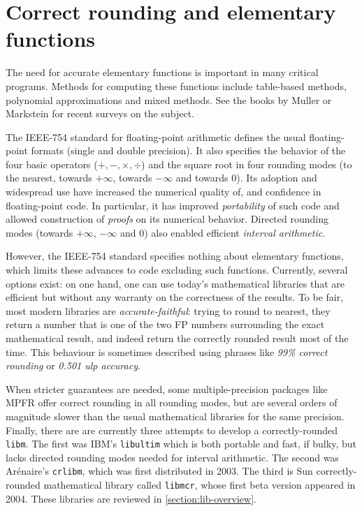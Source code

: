 



\section{Correct rounding and elementary functions}
\label{sect:intro}

The need for accurate elementary functions is important in many
critical programs.  Methods for computing these functions include
table-based methods\cite{Far81,Tan91}, polynomial approximations and
mixed methods\cite{DauMor2k}. See the books by Muller\cite{Muller97} or
Markstein\cite{Markstein2000} for recent surveys on the subject.

The IEEE-754 standard for floating-point arithmetic\cite{IEEE754}
defines the usual floating-point formats (single and double
precision). It also specifies the behavior of the four basic operators
($+,-,\times,\div$) and the square root in four rounding modes (to the
nearest, towards $+\infty$, towards $-\infty$ and towards $0$). Its
adoption and widespread use have increased the numerical quality of,
and confidence in floating-point code. In particular, it has improved
\emph{portability} of such code and allowed construction of
\emph{proofs} on its numerical behavior. Directed rounding modes
(towards $+\infty$, $-\infty$ and $0$) also enabled efficient
\emph{interval arithmetic}\cite{Moore66,KKLRW93}.

However, the IEEE-754 standard specifies nothing about elementary
functions, which limits these advances to code excluding such
functions.  Currently, several options exist: on one hand, one can use
today's mathematical libraries that are efficient but without any
warranty on the correctness of the results. To be fair, most modern
libraries are \emph{accurate-faithful}: trying to round to nearest,
they return a number that is one of the two FP numbers surrounding the
exact mathematical result, and indeed return the correctly rounded
result most of the time. This behaviour is sometimes described using
phrases like \emph{99\% correct rounding} or \emph{0.501 ulp accuracy}.

When stricter guarantees are needed, some multiple-precision packages
like MPFR \cite{MPFRweb} offer correct rounding in all rounding modes,
but are several orders of magnitude slower than the usual mathematical
libraries for the same precision. Finally, there are are currently
three attempts to develop a correctly-rounded \texttt{libm}. The first
was IBM's \texttt{libultim}\cite{IBMlibultimweb} which is both
portable and fast, if bulky, but lacks directed rounding modes needed
for interval arithmetic. The second was Ar\'enaire's \texttt{crlibm},
which was first distributed in 2003. The third is Sun
correctly-rounded mathematical library called \texttt{libmcr}, whose
first beta version appeared in 2004.  These libraries are reviewed in
\ref{section:lib-overview}.

